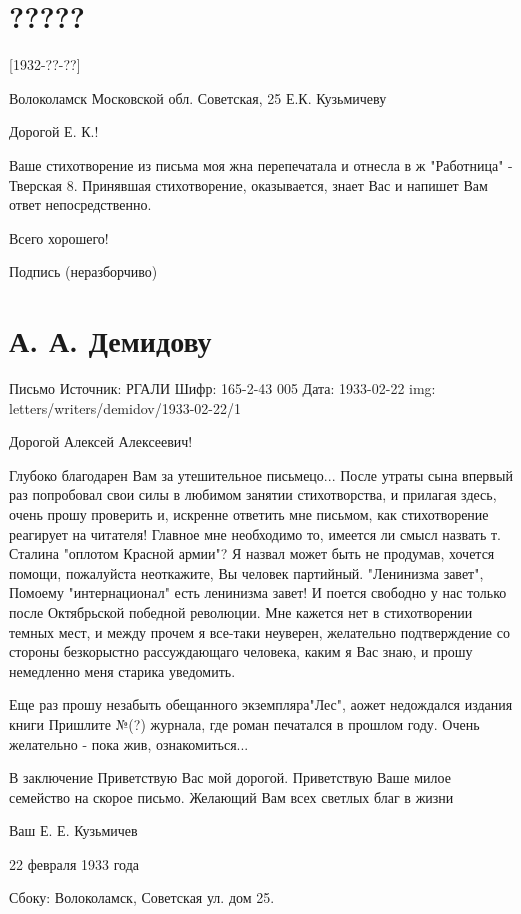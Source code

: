 \documentclass[]{memoir}
\begin{document}
\section{?????}

[1932-??-??]

Волоколамск Московской обл. Советская, 25
Е.К. Кузьмичеву

Дорогой Е. К.!

Ваше стихотворение из письма моя жна перепечатала и отнесла в ж "Работница" - Тверская 8.
Принявшая стихотворение, оказывается, знает Вас и напишет Вам ответ непосредственно.

Всего хорошего!

Подпись (неразборчиво)

\section{А. А. Демидову}

Письмо
Источник: РГАЛИ
Шифр: 165-2-43 005
Дата: 1933-02-22
img: letters/writers/demidov/1933-02-22/1

Дорогой Алексей Алексеевич!

Глубоко благодарен Вам за утешительное письмецо... После утраты сына впервый раз попробовал свои силы в любимом занятии стихотворства, и прилагая здесь, очень прошу проверить и, искренне ответить мне письмом, как стихотворение реагирует на читателя! Главное мне необходимо то, имеется ли смысл назвать т. Сталина "оплотом Красной армии"? Я назвал может быть не продумав, хочется помощи, пожалуйста неоткажите, Вы человек партийный. "Ленинизма завет", Помоему "интернационал" есть ленинизма завет! И поется свободно у нас только после Октябрьской победной революции. Мне кажется нет в стихотворении темных мест, и между прочем я все-таки неуверен, желательно подтверждение со стороны безкорыстно рассуждающаго человека, каким я Вас знаю, и прошу немедленно меня старика уведомить.

Еще раз прошу незабыть обещанного экземпляра"Лес", аожет недождался издания книги Пришлите №(?) журнала, где роман печатался в прошлом году. Очень желательно - пока жив, ознакомиться...

В заключение Приветствую Вас мой дорогой. Приветствую Ваше милое семейство на скорое письмо. Желающий Вам всех светлых благ в жизни

Ваш Е. Е. Кузьмичев

22 февраля 1933 года

Сбоку: Волоколамск, Советская ул. дом 25.
\end{document}
